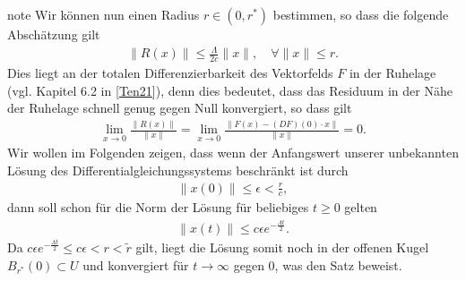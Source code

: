 \documentclass[letterpaper,10pt,german]{jupyterBook}
\begin{document}
\begin{sphinxadmonition}{note}
\sphinxAtStartPar
Wir können nun einen Radius \(r\in (0,{r^\ast})\) bestimmen, so dass die folgende Abschätzung gilt
\begin{equation}\label{equation:odestability/ruhelagen:eq:residuum}
\begin{split}\|R(x)\| \leq \frac{\Lambda}{2c} \|x\|, \quad \forall \|x\| \leq r.\end{split}
\end{equation}
\sphinxAtStartPar
Dies liegt an der totalen Differenzierbarkeit des Vektorfelds \(F\) in der Ruhelage (vgl. Kapitel 6.2 in {[}\hyperlink{cite.references:id15}{Ten21}{]}), denn dies bedeutet, dass das Residuum in der Nähe der Ruhelage schnell genug gegen Null konvergiert, so dass gilt
\begin{equation*}
\begin{split}\lim_{x\to 0} \frac{\|R(x)\|}{\|x\|} = \lim_{x\to 0}\frac{\|F(x)- (DF)(0)\cdot x\|}{\|x\|} = 0.\end{split}
\end{equation*}
\sphinxAtStartPar
Wir wollen im Folgenden zeigen, dass wenn der Anfangswert unserer unbekannten Lösung des Differentialgleichungssystems beschränkt ist durch
\begin{equation*}
\begin{split}\|x(0)\| \leq \epsilon <\frac{r}{c},\end{split}
\end{equation*}
\sphinxAtStartPar
dann soll schon für die Norm der Lösung für beliebiges \(t \geq 0\) gelten
\begin{equation*}
\begin{split}\|x(t)\| \leq c\epsilon e^{-\frac{\Lambda t}{2}}.\end{split}
\end{equation*}
\sphinxAtStartPar
Da \(c\epsilon e^{- \frac{\Lambda t}{2}} \leq c\epsilon < r <\tilde{r}\) gilt, liegt die Lösung somit noch in der offenen Kugel \(B_{{r^\ast}}(0) \subset U\) und konvergiert für \(t \rightarrow \infty\) gegen 0, was den Satz beweist.


\end{sphinxadmonition}
\end{document}
